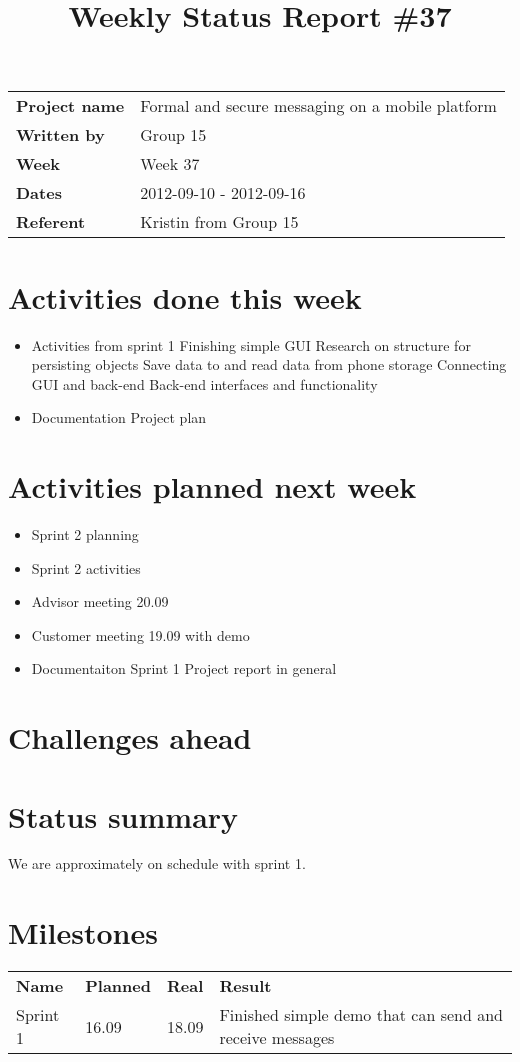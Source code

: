\documentclass[a4paper,12pt]{article}
\begin{document}
\title{Weekly Status Report \#37}
\maketitle
\begin{tabular}{>{\bfseries}l l}	
Project name&Formal and secure messaging on a mobile platform\\
Written by&Group 15\\
Week&Week 37\\
Dates&2012-09-10 - 2012-09-16\\
Referent&Kristin from Group 15\\
\end{tabular}

\section{Activities done this week}
\begin{itemize}
\item
Activities from sprint 1
\subitem
Finishing simple GUI
\subitem
Research on structure for persisting objects
\subitem
Save data to and read data from phone storage
\subitem
Connecting GUI and back-end
\subitem
Back-end interfaces and functionality
\item
Documentation
\subitem
Project plan
\end{itemize}
\section{Activities planned next week}
\begin{itemize}
\item
Sprint 2 planning
\item
Sprint 2 activities
\item
Advisor meeting 20.09
\item
Customer meeting 19.09 with demo
\item
Documentaiton
\subitem
Sprint 1
\subitem
Project report in general
\end{itemize}
\section{Challenges ahead}
\section{Status summary}
We are approximately on schedule with sprint 1.
\section{Milestones}
\begin{tabular}{l l l l}	
\textbf{Name}&\textbf{Planned}&\textbf{Real}&\textbf{Result}\\
Sprint 1&16.09&18.09&Finished simple demo that can send and receive messages
\end{tabular}
\end{document}
